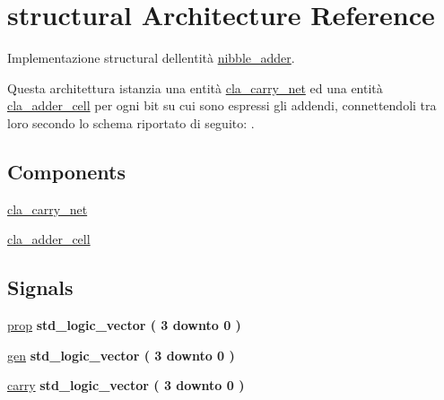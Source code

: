\hypertarget{classnibble__adder_1_1structural}{}\section{structural Architecture Reference}
\label{classnibble__adder_1_1structural}


Implementazione structural dell\textquotesingle{}entità \hyperlink{classnibble__adder}{nibble\+\_\+adder}.

Questa architettura istanzia una entità \hyperlink{classcla__carry__net}{cla\+\_\+carry\+\_\+net} ed una entità \hyperlink{classcla__adder__cell}{cla\+\_\+adder\+\_\+cell} per ogni bit su cui sono espressi gli addendi, connettendoli tra loro secondo lo schema riportato di seguito\+: .  


\subsection*{Components}
 \begin{DoxyCompactItemize}
\item 
\hyperlink{group___nibble_adder_ga12bdc5892f526938e1447d663d152df8}{cla\+\_\+carry\+\_\+net}  {\bfseries }  
\item 
\hyperlink{group___nibble_adder_ga4f13eb52457f650b1d2cd352d9cacca9}{cla\+\_\+adder\+\_\+cell}  {\bfseries }  
\end{DoxyCompactItemize}
\subsection*{Signals}
 \begin{DoxyCompactItemize}
\item 
\hyperlink{group___nibble_adder_ga3abd8d433ff039baabc0c6fc2126578b}{prop} {\bfseries \textcolor{vhdlchar}{std\+\_\+logic\+\_\+vector}\textcolor{vhdlchar}{ }\textcolor{vhdlchar}{(}\textcolor{vhdlchar}{ }\textcolor{vhdlchar}{ } \textcolor{vhdldigit}{3} \textcolor{vhdlchar}{ }\textcolor{vhdlchar}{downto}\textcolor{vhdlchar}{ }\textcolor{vhdlchar}{ } \textcolor{vhdldigit}{0} \textcolor{vhdlchar}{ }\textcolor{vhdlchar}{)}\textcolor{vhdlchar}{ }} 
\item 
\hyperlink{group___nibble_adder_gac6c069fe4ec1c0a42272d3de4be6f45f}{gen} {\bfseries \textcolor{vhdlchar}{std\+\_\+logic\+\_\+vector}\textcolor{vhdlchar}{ }\textcolor{vhdlchar}{(}\textcolor{vhdlchar}{ }\textcolor{vhdlchar}{ } \textcolor{vhdldigit}{3} \textcolor{vhdlchar}{ }\textcolor{vhdlchar}{downto}\textcolor{vhdlchar}{ }\textcolor{vhdlchar}{ } \textcolor{vhdldigit}{0} \textcolor{vhdlchar}{ }\textcolor{vhdlchar}{)}\textcolor{vhdlchar}{ }} 
\item 
\hyperlink{group___nibble_adder_ga8f5524d80e551d479327a16bb32abcaa}{carry} {\bfseries \textcolor{vhdlchar}{std\+\_\+logic\+\_\+vector}\textcolor{vhdlchar}{ }\textcolor{vhdlchar}{(}\textcolor{vhdlchar}{ }\textcolor{vhdlchar}{ } \textcolor{vhdldigit}{3} \textcolor{vhdlchar}{ }\textcolor{vhdlchar}{downto}\textcolor{vhdlchar}{ }\textcolor{vhdlchar}{ } \textcolor{vhdldigit}{0} \textcolor{vhdlchar}{ }\textcolor{vhdlchar}{)}\textcolor{vhdlchar}{ }} 
\end{DoxyCompactItemize}
